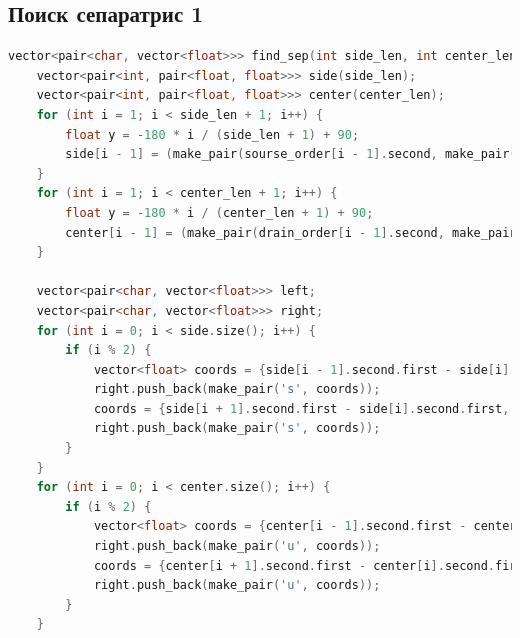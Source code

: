\subsection{Поиск сепаратрис 1}
\begin{lstlisting}[language=C++]
vector<pair<char, vector<float>>> find_sep(int side_len, int center_len, vector<pair<char, int>> sourse_order, vector<pair<char, int>> drain_order, vector<pair<char, vector<int>>> neighbors) {
	vector<pair<int, pair<float, float>>> side(side_len);
	vector<pair<int, pair<float, float>>> center(center_len);
	for (int i = 1; i < side_len + 1; i++) {
		float y = -180 * i / (side_len + 1) + 90;
		side[i - 1] = (make_pair(sourse_order[i - 1].second, make_pair(0, y)));
	}
	for (int i = 1; i < center_len + 1; i++) {
		float y = -180 * i / (center_len + 1) + 90;
		center[i - 1] = (make_pair(drain_order[i - 1].second, make_pair(180, y)));
	}
	
	vector<pair<char, vector<float>>> left;
	vector<pair<char, vector<float>>> right;
	for (int i = 0; i < side.size(); i++) {
		if (i % 2) {
			vector<float> coords = {side[i - 1].second.first - side[i].second.first, side[i].second.first, side[i - 1].second.second - side[i].second.second, side[i].second.second, 0, 1};
			right.push_back(make_pair('s', coords));
			coords = {side[i + 1].second.first - side[i].second.first, side[i].second.first, side[i + 1].second.second - side[i].second.second, side[i].second.second, 0, 1};
			right.push_back(make_pair('s', coords));
		}
	}
	for (int i = 0; i < center.size(); i++) {
		if (i % 2) {
			vector<float> coords = {center[i - 1].second.first - center[i].second.first, center[i].second.first, center[i - 1].second.second - center[i].second.second, center[i].second.second, 0, 1};
			right.push_back(make_pair('u', coords));
			coords = {center[i + 1].second.first - center[i].second.first, center[i].second.first, center[i + 1].second.second - center[i].second.second, center[i].second.second, 0, 1};
			right.push_back(make_pair('u', coords));
		}
	}
	

\end{lstlisting}
